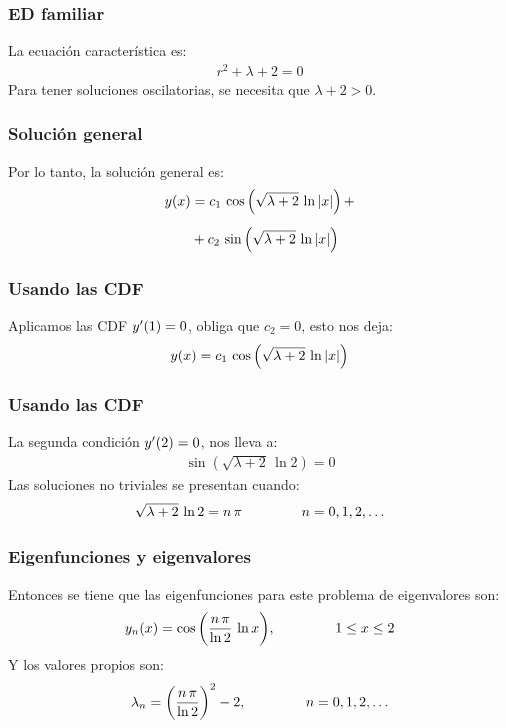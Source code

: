 \documentclass[12pt]{beamer}
\begin{document}
\begin{frame}
\frametitle{ED familiar}
La ecuación característica es:
\pause
\begin{align*}
r^{2} + \lambda + 2 = 0
\end{align*}
\pause
Para tener soluciones oscilatorias, se necesita que $\lambda + 2 > 0$.
\end{frame}
\begin{frame}
\frametitle{Solución general}
Por lo tanto, la solución general es:
\pause
\begin{align}
\begin{aligned}
y (x) &= c_{1} \, \cos \left( \sqrt{\lambda + 2} \, \ln \abs{x} \right) + \\[0.5em]
&+ c_{2} \, \sin \left( \sqrt{\lambda + 2} \, \ln \abs{x} \right)
\end{aligned}
\label{eq:ecuacion_04_15}
\end{align}
\end{frame}
\begin{frame}
\frametitle{Usando las CDF}
Aplicamos las CDF ${y}^{\prime}(1) = 0$, \pause obliga que $c_{2} = 0$, esto nos deja:
\pause
\begin{align*}
y(x) = c_{1} \, \cos \left( \sqrt{\lambda + 2} \, \ln \abs{x} \right)
\end{align*}
\end{frame}
\begin{frame}
\frametitle{Usando las CDF}
La segunda condición ${y}^{\prime}(2) = 0$, nos lleva a:
\pause
\begin{align*}
\sin \left( \sqrt{\lambda + 2} \, \ln 2 \right) = 0
\end{align*}
\pause
Las soluciones no triviales se presentan cuando:
\pause
\begin{align*}
\sqrt{\lambda + 2} \, \ln 2 = n \, \pi \hspace{1.5cm} n = 0, 1, 2, \ldots
\end{align*}
\end{frame}
\begin{frame}
\frametitle{Eigenfunciones y eigenvalores}
Entonces se tiene que las eigenfunciones para este problema de eigenvalores son:
\pause
\begin{align*}
y_{n}(x) = \cos \bigg( \dfrac{n \, \pi}{\ln 2} \, \ln x \bigg), \hspace{1.5cm} 1 \leq x \leq 2
\end{align*}
\pause
Y los valores propios son:
\pause
\begin{align*}
\lambda_{n} = \bigg( \dfrac{n \, \pi}{\ln 2} \bigg)^{2} - 2, \hspace{1.5cm} n = 0, 1, 2, \ldots
\end{align*}
\end{frame}
\end{document}
